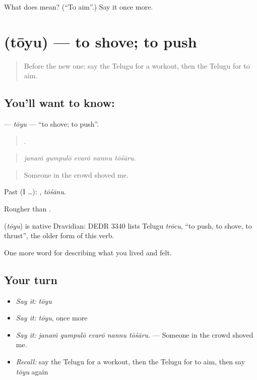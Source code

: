 \begin{tcolorbox}[breakable,colback=teal!4,colframe=teal!35!black,title={Before you move on}]
What does  mean? (\textquotedblleft{}To aim\textquotedblright{}.) Say it once more.
\end{tcolorbox}
\section[\texorpdfstring{\te{తోయు} (tōyu)}{తోయు (tōyu)}]{ (tōyu) — to shove; to push}

\label{lesson:TE-C545-toyu}



\begin{quote}
Before the new one: say the Telugu for a workout, then the Telugu for to aim.
\end{quote}

\subsection*{You'll want to know: }
\textbf{} — \emph{tōyu} — \textquotedblleft{}to shove; to push\textquotedblright{}.

\begin{quote}
    .
\end{quote}

\begin{quote}
\emph{janaṁ gumpulō evarō nannu tōśāru.}
\end{quote}

\begin{quote}
Someone in the crowd shoved me.
\end{quote}

Past (I …): , \emph{tōśānu}.

Rougher than .

\begin{cousinweb}
\textbf{} (\emph{tōyu}) is native Dravidian: DEDR 3340 lists Telugu \emph{trōcu}, \textquotedblleft{}to push, to shove, to thrust\textquotedblright{}, the older form of this verb.
\end{cousinweb}

\begin{grammarlens}[title={What you've built}]
One more word for describing what you lived and felt.
\end{grammarlens}

\subsection*{Your turn}
\begin{itemize}
\raggedright
  \item \emph{Say it:} \emph{tōyu}
  \item \emph{Say it:} \emph{tōyu}, once more
  \item \emph{Say it:} \emph{janaṁ gumpulō evarō nannu tōśāru.} — Someone in the crowd shoved me.
  \item \emph{Recall:} say the Telugu for a workout, then the Telugu for to aim, then say \emph{tōyu} again
\end{itemize}

